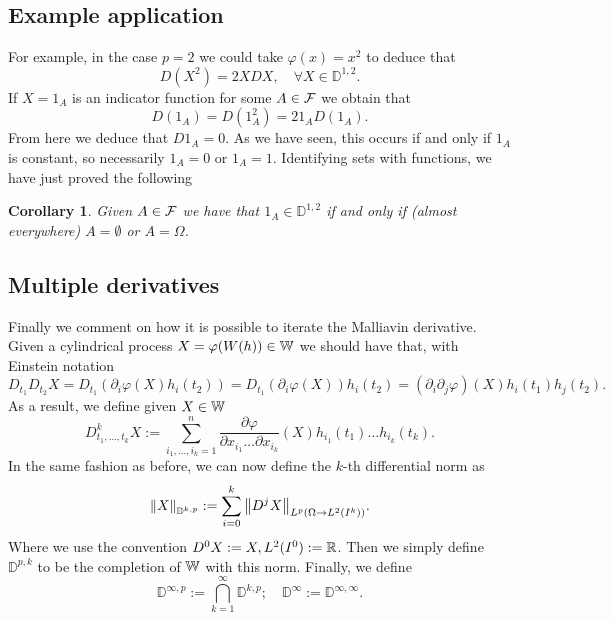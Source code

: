 \documentclass[12pt]{article}
\newtheorem{corollary}{Corollary}
\begin{document}
\subsection{Example application}
For example, in the case $p=2$ we could take $\varphi(x)=x^2$ to deduce that
\begin{equation*}
	D(X^2)=2XDX,\quad\forall X\in \mathbb{D}^{1,2}.
\end{equation*}
If $X=1_A$ is an indicator function for some  $A\in \mathcal{F}$ we obtain that
\begin{equation*}
	D(1_A)=D(1_A^2)=21_AD(1_A).
\end{equation*}
From here we deduce that $D1_A=0$. As we have seen, this occurs if and only if $1_A$ is constant, so necessarily  $1_A=0$ or  $1_A=1$. Identifying sets with functions, we have just proved the following
\begin{corollary}
	Given $A\in \mathcal{F}$ we have that $1_A\in \mathbb{D}^{1,2}$ if and only if (almost everywhere) $A=\emptyset$ or $A=\Omega$.
\end{corollary}


\subsection{Multiple derivatives}
Finally we comment on how it is possible to iterate the Malliavin derivative. Given a cylindrical process $X=\varphi(W(h))\in \mathbb{W}$ we should have that, with Einstein notation
\begin{equation*}
	D_{t_1}D_{t_2}X=D_{t_1}(\partial_i \varphi(X)h_i(t_2))=D_{t_1}(\partial_i \varphi(X))h_i(t_2)=(\partial_i\partial _j \varphi)(X)h_i(t_1)h_j(t_2).
\end{equation*}
As a result, we define given $X\in \mathbb{W}$
\begin{equation*}
	D^k_{t_1,\ldots,t_k} X:= \sum_{i_1,\ldots,i_k=1}^{n}  \frac{\partial \varphi}{\partial x_{i_1}\ldots\partial x_{i_k}}(X)h_{i_1}(t_1)\ldots h_{i_k}(t_k) .
\end{equation*}
In the same fashion as before, we can now define the $k$-th differential norm as
\begin{equation*}
	\norm{X}_{\mathbb{D}^{k,p}}:=\sum_{i=0}^{k}  \norm{D^j X}_{L^p(\Omega\to L^2(I^k))}.
\end{equation*}
Where we use the convention $D^0 X:=X, L^2(I^0):= {\mathbb R}$. Then we simply define $\mathbb{D}^{p,k}$ to be the completion of $\mathbb{W}$ with this norm. Finally, we define
\begin{equation*}
	\mathbb{D}^{\infty,p}:= \bigcap_{k=1}^\infty \mathbb{D}^{k,p};\quad \mathbb{D}^{\infty}:= \mathbb{D}^{\infty,\infty} .
\end{equation*}


\end{document}
